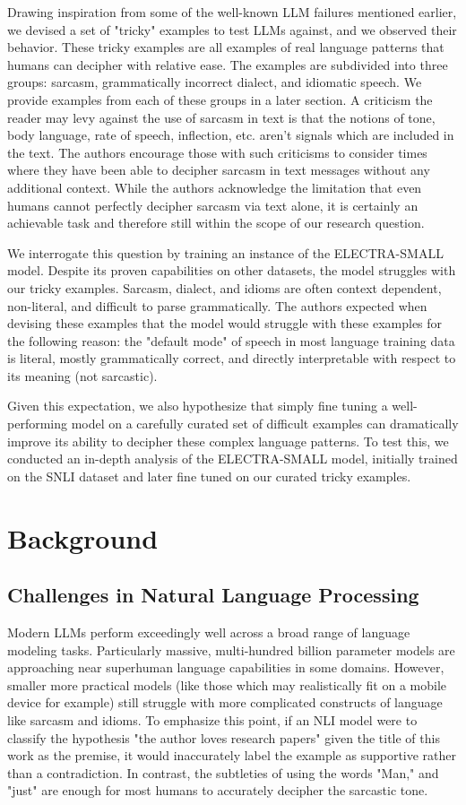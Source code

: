 \documentclass{article}
\begin{document}
Drawing inspiration from some of the well-known LLM failures mentioned earlier, we devised a set of "tricky" examples to
test LLMs against, and we observed their behavior. These tricky examples are all examples of real language patterns that
humans can decipher with relative ease. The examples are subdivided into three groups:  sarcasm, grammatically incorrect
dialect, and idiomatic speech. We provide examples from each of these groups in a later section.
A criticism the reader may levy against the use of sarcasm in text is that the notions of tone,
body language, rate of speech, inflection, etc. aren't signals which are included in the text. The authors encourage those
with such criticisms to consider times where they have been able to decipher sarcasm in text messages without any additional
context. While the authors acknowledge the limitation that even humans cannot perfectly decipher sarcasm via text alone,
it is certainly an achievable task and therefore still within the scope of our research question.

We interrogate this question by training an instance of the ELECTRA-SMALL model. Despite its proven capabilities on other datasets,
the model struggles with our tricky examples. Sarcasm, dialect, and idioms are often context dependent, non-literal, and
difficult to parse grammatically. The authors expected when devising these examples that the model would struggle with these
examples for the following reason:  the "default mode" of speech in most language training data is literal, mostly grammatically
correct, and directly interpretable with respect to its meaning (not sarcastic).

Given this expectation, we also hypothesize that simply fine tuning a well-performing model on a carefully curated set
of difficult examples can dramatically improve its ability to decipher these complex language patterns. To test this,
we conducted an in-depth analysis of the ELECTRA-SMALL model, initially trained on the SNLI dataset and later fine tuned
on our curated tricky examples.

\section{Background}

\subsection{Challenges in Natural Language Processing}
Modern LLMs perform exceedingly well across a broad range of language modeling tasks. Particularly massive, multi-hundred billion
parameter models are approaching near superhuman language capabilities in some domains. However, smaller more practical models
(like those which may realistically fit on a mobile device for example) still struggle with more complicated constructs of language
like sarcasm and idioms. To emphasize this point, if an NLI model were to classify the hypothesis "the author loves research papers"
given the title of this work as the premise, it would inaccurately label the example as supportive rather than a contradiction.
In contrast, the subtleties of using the words "Man," and "just" are enough for most humans to accurately decipher the
sarcastic tone.
\end{document}
